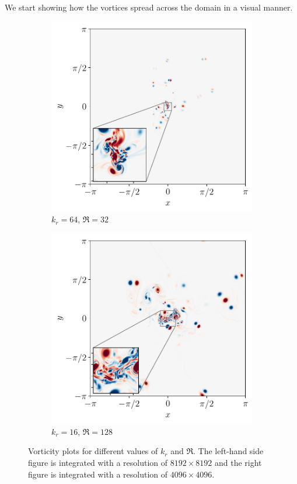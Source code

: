 \documentclass[../main.tex]{subfiles}
\begin{document}
We start showing how the vortices spread across the domain in a visual manner.
\begin{figure}[ht]
	\centering
	\begin{subfigure}{0.44\textwidth}
		\centering
		\includegraphics[width=\textwidth]{images/domainRe32kdn64.pdf}
		\caption{$k_r = 64$, $\Re = 32$}
	\end{subfigure}\hspace{0.04\textwidth}
	\begin{subfigure}{0.44\textwidth}
		\centering
		\includegraphics[width=\textwidth]{images/domainRe128kdn16.pdf}
		\caption{$k_r = 16$, $\Re = 128$}
	\end{subfigure}
	\caption{Vorticity plots for different values of $k_r$ and $\Re$. The left-hand side figure is integrated with a resolution of $8192\times 8192$ and the right figure is integrated with a resolution of $4096\times 4096$.}\label{fig:vortices_evo}
\end{figure}
\end{document}
